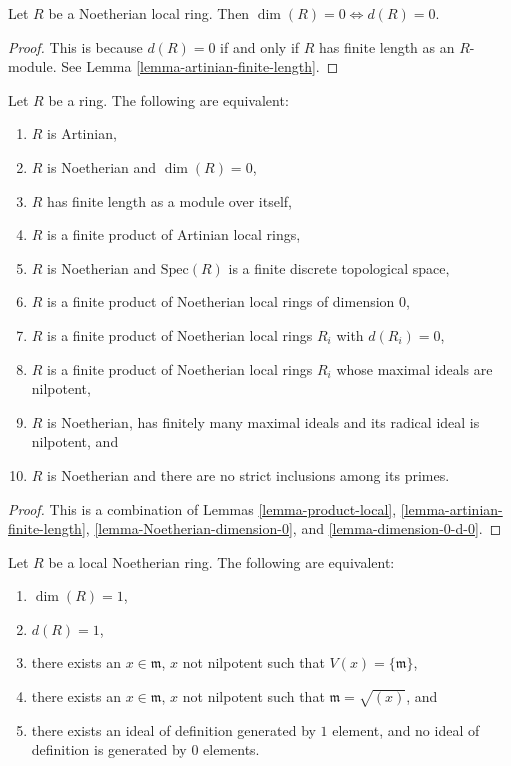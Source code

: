 \begin{lemma}
\label{lemma-dimension-0-d-0}
Let $R$ be a Noetherian local ring.
Then $\dim(R) = 0 \Leftrightarrow d(R) = 0$.
\end{lemma}

\begin{proof}
This is because $d(R) = 0$ if and only if $R$ has finite
length as an $R$-module. See Lemma \ref{lemma-artinian-finite-length}.
\end{proof}

\begin{proposition}
\label{proposition-dimension-zero-ring}
Let $R$ be a ring. The following are equivalent:
\begin{enumerate}
\item $R$ is Artinian,
\item $R$ is Noetherian and $\dim(R) = 0$,
\item $R$ has finite length as a module over itself,
\item $R$ is a finite product of Artinian local rings,
\item $R$ is Noetherian and $\text{Spec}(R)$ is a
finite discrete topological space,
\item $R$ is a finite product of Noetherian local rings
of dimension $0$,
\item $R$ is a finite product of Noetherian local rings
$R_i$ with $d(R_i) = 0$,
\item $R$ is a finite product of Noetherian local rings
$R_i$ whose maximal ideals are nilpotent,
\item $R$ is Noetherian, has finitely many maximal
ideals and its radical ideal is nilpotent, and
\item $R$ is Noetherian and there are no strict inclusions
among its primes.
\end{enumerate}
\end{proposition}

\begin{proof}
This is a combination of Lemmas
\ref{lemma-product-local},
\ref{lemma-artinian-finite-length},
\ref{lemma-Noetherian-dimension-0}, and
\ref{lemma-dimension-0-d-0}.
\end{proof}

\begin{lemma}
\label{lemma-height-1}
Let $R$ be a local Noetherian ring.
The following are equivalent:
\begin{enumerate}
\item $\dim(R) = 1$,
\label{item-dim-1}
\item $d(R) = 1$,
\label{item-d-1}
\item there exists an $x \in \mathfrak m$, $x$ not nilpotent
such that $V(x) = \{\mathfrak m\}$,
\label{item-Vx}
\item there exists an $x \in \mathfrak m$, $x$ not nilpotent
such that $\mathfrak m = \sqrt{(x)}$, and
\label{item-x}
\item there exists an ideal of definition generated by $1$ element,
and no ideal of definition is generated by $0$ elements.
\label{item-ideal-1}
\end{enumerate}
\end{lemma}

